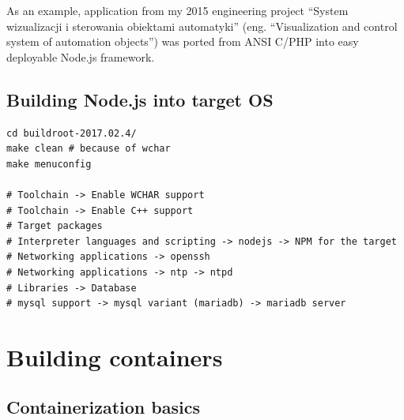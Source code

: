 \documentclass[printmode]{mgr}
\begin{document}
As an example, application from my 2015 engineering project ``System wizualizacji i sterowania obiektami automatyki'' (eng. ``Visualization and control system of automation objects'') was ported from ANSI C/PHP into easy deployable Node.js framework.

\subsection*{Building Node.js into target OS}

\begin{lstlisting}
cd buildroot-2017.02.4/
make clean # because of wchar
make menuconfig

# Toolchain -> Enable WCHAR support
# Toolchain -> Enable C++ support
# Target packages
# Interpreter languages and scripting -> nodejs -> NPM for the target
# Networking applications -> openssh
# Networking applications -> ntp -> ntpd
# Libraries -> Database
# mysql support -> mysql variant (mariadb) -> mariadb server
\end{lstlisting}






















\section{Building containers}


\subsection*{Containerization basics}
\end{document}
